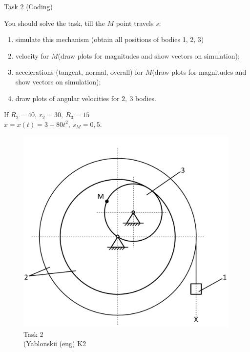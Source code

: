 \documentclass[aspectratio=169]{beamer}
\begin{document}
\begin{frame}[t]{Task 2 (Coding)}
    \vspace*{-0.2cm}
\begin{minipage}{0.6\textwidth}
    You should solve the task, till the $M$ point travels $s$:
    \begin{enumerate}
        \item simulate this mechanism (obtain all positions of bodies 1, 2, 3)
        \item velocity for $M$(draw plots for magnitudes and show vectors on simulation);
        \item accelerations (tangent, normal, overall) for $M$(draw plots for magnitudes and show vectors on simulation);
        \item draw plots of angular velocities for $2,\ 3$ bodies.
    \end{enumerate}
    If $R_2=40,\ r_2=30,\ R_3=15$\\ 
    $x=x(t)=3+80t^2,\ s_M=0,5$.
    
    \end{minipage}
    \begin{minipage}{0.39\textwidth}
          \begin{figure}[H]
        \includegraphics[width=0.99\textwidth]{HW1_2.png}
        \caption*{Task 2 \\ (Yablonskii (eng) K2}
        \end{figure}
    \end{minipage}
\end{frame}
\end{document}
